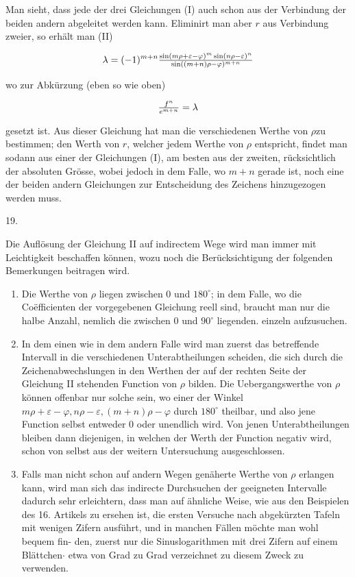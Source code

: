 \documentclass[twoside,12pt, showframe]{memoir}
\let\oldfrac\frac
\def\frac#1#2{\mathchoice{\tfrac{#1}{#2}}{\oldfrac{#1}{#2}}{\genfrac{}{}{}{2}{#1}{#2\mathstrut}}{\genfrac{}{}{}{3}{#1}{#2\mathstrut}}}
\begin{document}
Man sieht, dass jede der drei Gleichungen (I) auch schon aus der Verbindung der beiden andern abgeleitet werden kann. Eliminirt man aber \(r\) aus Verbindung zweier, so erhält man (II)

\[
\lambda=(-1)^{m+n} \frac{\sin (m \rho+\varepsilon-\varphi)^{m} \sin (n \rho-\varepsilon)^{n}}{\sin ((m+n) \rho-\varphi)^{m+n}}
\]

wo zur Abkürzung (eben so wie oben)

\[
\frac{f^{n}}{e^{m+n}}=\lambda
\]

gesetzt ist. Aus dieser Gleichung hat man die verschiedenen Werthe von \(\rho \mathrm{zu}\) bestimmen; den Werth von \(r\), welcher jedem Werthe von \(\rho\) entspricht, findet man sodann aus einer der Gleichungen (I), am besten aus der zweiten, rücksichtlich der absoluten Grösse, wobei jedoch in dem Falle, wo \(m+n\) gerade ist, noch eine der beiden andern Gleichungen zur Entscheidung des Zeichens hinzugezogen werden muss.

19.

Die Auflösung der Gleichung II auf indirectem Wege wird man immer mit Leichtigkeit beschaffen können, wozu noch die Berücksichtigung der folgenden Bemerkungen beitragen wird.

\begin{enumerate}
  \item Die Werthe von \(\rho\) liegen zwischen 0 und \(180^{\circ}\); in dem Falle, wo die Coëfficienten der vorgegebenen Gleichung reell sind, braucht man nur die halbe Anzahl, nemlich die zwischen 0 und \(90^{\circ}\) liegenden. einzeln aufzusuchen.

  \item In dem einen wie in dem andern Falle wird man zuerst das betreffende Intervall in die verschiedenen Unterabtheilungen scheiden, die sich durch die Zeichenabwechslungen in den Werthen der auf der rechten Seite der Gleichung II stehenden Function von \(\rho\) bilden. Die Uebergangswerthe von \(\rho\) können offenbar nur solche sein, wo einer der Winkel \(m \rho+\varepsilon-\varphi, n \rho-\varepsilon,(m+n) \rho-\varphi\) durch \(180^{\circ}\) theilbar, und also jene Function selbst entweder 0 oder unendlich wird. Von jenen Unterabtheilungen bleiben dann diejenigen, in welchen der Werth der Function negativ wird, schon von selbst aus der weitern Untersuchung ausgeschlossen.

  \item Falls man nicht schon auf andern Wegen genäherte Werthe von \(\rho\) erlangen kann, wird man sich das indirecte Durchsuchen der geeigneten Intervalle dadurch sehr erleichtern, dass man auf ähnliche Weise, wie aus den Beispielen des 16. Artikels zu ersehen ist, die ersten Versuche nach abgekürzten Tafeln mit wenigen Zifern ausführt, und in manchen Fällen möchte man wohl bequem fin-
den, zuerst nur die Sinuslogarithmen mit drei Zifern auf einem Blättchen\(\cdot\) etwa von Grad zu Grad verzeichnet zu diesem Zweck zu verwenden.

\end{enumerate}
\end{document}
